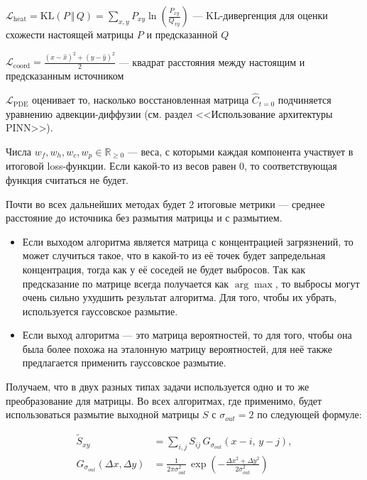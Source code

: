 \documentclass[12pt]{article}
\newcommand{\RR}{\mathbb{R}}
\newcommand{\ds}{\displaystyle}
\begin{document}
$\ds \mathcal{L}_{\text{heat}}=\mathrm{KL}(P \,\Vert\, Q) = \sum_{x, y} P_{xy} \ln\left(\frac{P_{xy}}{Q_{xy}}\right)$ --- KL-дивергенция для оценки схожести настоящей матрицы $P$ и предсказанной $Q$

$\ds \mathcal{L}_{\text{coord}}=\frac{(x - \hat{x})^2 + (y - \hat{y})^2}{2}$ --- квадрат расстояния между настоящим и предсказанным источником


$\mathcal{L}_{\text{PDE}}$ оценивает то, насколько восстановленная матрица $\hat{C}_{t=0}$ подчиняется уравнению адвекции-диффузии (см. раздел <<Использование архитектуры PINN>>).

Числа $w_f, w_h, w_c, w_p \in \RR_{\ge 0}$ --- веса, с которыми каждая компонента участвует в итоговой loss-функции. Если какой-то из весов равен 0, то соответствующая функция считаться не будет.

Почти во всех дальнейших методах будет 2 итоговые метрики --- среднее расстояние до источника без размытия матрицы и с размытием.

\begin{itemize}
    \item Если выходом алгоритма является матрица с концентрацией загрязнений, то может случиться такое, что в какой-то из её точек будет запредельная концентрация, тогда как у её соседей не будет выбросов. Так как предсказание по матрице всегда получается как $\arg\max$, то выбросы могут очень сильно ухудшить результат алгоритма. Для того, чтобы их убрать, используется гауссовское размытие.
    \item Если выход алгоритма --- это матрица вероятностей, то для того, чтобы она была более похожа на эталонную матрицу вероятностей, для неё также предлагается применить гауссовское размытие.
\end{itemize}

Получаем, что в двух разных типах задачи используется одно и то же преобразование для матрицы. Во всех алгоритмах, где применимо, будет использоваться размытие выходной матрицы $S$ с $\sigma_{out} = 2$ по следующей формуле:

$$
\begin{aligned}
\tilde{S}_{xy} &= \sum_{i, j} S_{ij}\, G_{\sigma_{out}}(x - i,\, y - j), \\
G_{\sigma_{out}}(\Delta x, \Delta y) &= \frac{1}{2\pi\sigma_{out}^2}\, \exp\!\left(-\frac{\Delta x^2 + \Delta y^2}{2\sigma_{out}^2}\right)
\end{aligned}
$$

\newpage
\end{document}
